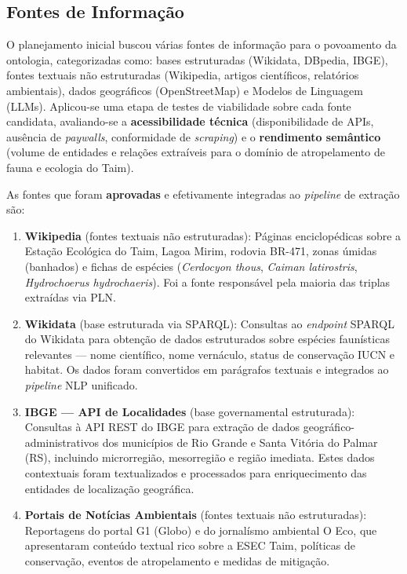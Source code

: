\documentclass[10pt,conference]{IEEEtran}
\begin{document}
\subsection{Fontes de Informação}

O planejamento inicial buscou várias fontes de informação para o povoamento da ontologia, categorizadas como: bases estruturadas (Wikidata, DBpedia, IBGE), fontes textuais não estruturadas (Wikipedia, artigos científicos, relatórios ambientais), dados geográficos (OpenStreetMap) e Modelos de Linguagem (LLMs). Aplicou-se uma etapa de testes de viabilidade sobre cada fonte candidata, avaliando-se a \textbf{acessibilidade técnica} (disponibilidade de APIs, ausência de \textit{paywalls}, conformidade de \textit{scraping}) e o \textbf{rendimento semântico} (volume de entidades e relações extraíveis para o domínio de atropelamento de fauna e ecologia do Taim).

As fontes que foram \textbf{aprovadas} e efetivamente integradas ao \textit{pipeline} de extração são:

\begin{enumerate}[label=\textbf{\arabic*.}]
    \item \textbf{Wikipedia} (fontes textuais não estruturadas): Páginas enciclopédicas sobre a Estação Ecológica do Taim, Lagoa Mirim, rodovia BR-471, zonas úmidas (banhados) e fichas de espécies (\textit{Cerdocyon thous}, \textit{Caiman latirostris}, \textit{Hydrochoerus hydrochaeris}). Foi a fonte responsável pela maioria das triplas extraídas via PLN.

    \item \textbf{Wikidata} (base estruturada via SPARQL): Consultas ao \textit{endpoint} SPARQL do Wikidata para obtenção de dados estruturados sobre espécies faunísticas relevantes — nome científico, nome vernáculo, status de conservação IUCN e habitat. Os dados foram convertidos em parágrafos textuais e integrados ao \textit{pipeline} NLP unificado.

    \item \textbf{IBGE — API de Localidades} (base governamental estruturada): Consultas à API REST do IBGE para extração de dados geográfico-administrativos dos municípios de Rio Grande e Santa Vitória do Palmar (RS), incluindo microrregião, mesorregião e região imediata. Estes dados contextuais foram textualizados e processados para enriquecimento das entidades de localização geográfica.

    \item \textbf{Portais de Notícias Ambientais} (fontes textuais não estruturadas): Reportagens do portal G1 (Globo) e do jornalísmo ambiental O Eco, que apresentaram conteúdo textual rico sobre a ESEC Taim, políticas de conservação, eventos de atropelamento e medidas de mitigação.
\end{enumerate}
\end{document}
